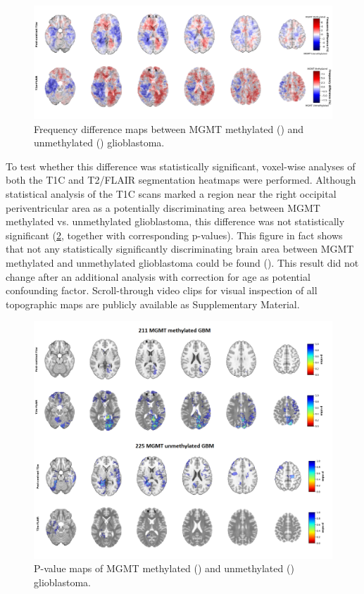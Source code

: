 \begin{figure}
    \centering
    \includegraphics[width=\textwidth]{Figures/Frequency_map.png}

    \caption{Frequency difference maps between \acrshort{MGMT} methylated () and unmethylated () glioblastoma.}\label{fig:HGG_location_frequency_map}
\end{figure}

To test whether this difference was statistically significant, voxel-wise analyses of both the \gls{T1C} and \gls{T2}/\gls{FLAIR} segmentation heatmaps were performed.
Although statistical analysis of the \gls{T1C} scans marked a region near the right occipital periventricular area as a potentially discriminating area between \gls{MGMT} methylated vs. unmethylated glioblastoma, this difference was not statistically significant (\cref{fig:HGG_location_pvalue_map}, together with corresponding p-values).
This figure in fact shows that not any statistically significantly discriminating brain area between \gls{MGMT} methylated and unmethylated glioblastoma could be found ().
This result did not change after an additional analysis with correction for age as potential confounding factor.
Scroll-through video clips for visual inspection of all topographic maps are publicly available as Supplementary Material.


\begin{figure}
    \centering
    \includegraphics[width=\textwidth]{Figures/Pvalue_map.png}

    \caption{P-value maps of \acrshort{MGMT} methylated () and unmethylated () glioblastoma.}\label{fig:HGG_location_pvalue_map}
\end{figure}


